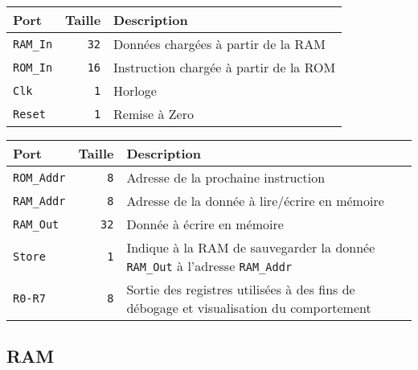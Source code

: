 \documentclass{article}
\begin{document}
    \begin{tabular}{|l|r|l|}
        \hline
        \textbf{Port}   & \textbf{Taille} & \textbf{Description}                   \\
        \hline

        \texttt{RAM\_In} & \texttt{32}     & Données chargées à partir de la RAM    \\
        \hline
        \texttt{ROM\_In} & \texttt{16}     & Instruction chargée à partir de la ROM \\
        \hline
        \texttt{Clk}    & \texttt{1}      & Horloge                                \\
        \hline
        \texttt{Reset}  & \texttt{1}      & Remise à Zero                          \\


        \hline
    \end{tabular}


    \begin{tabular}{|l|r|l|}
        \hline
        \textbf{Port}        & \textbf{Taille}     & \textbf{Description}                                                                       \\
        \hline

        \hline
        \texttt{ROM\_Addr} & \texttt{8}          & Adresse de la prochaine instruction                                                        \\
        \hline
        \texttt{RAM\_Addr} & \texttt{8}          & Adresse de la donnée à lire/écrire en mémoire                                              \\
        \hline
        \texttt{RAM\_Out}  & \texttt{32}         & Donnée à écrire en mémoire                                                                 \\
        \hline
        \texttt{Store}    & \texttt{1}          & Indique à la RAM de sauvegarder la donnée \texttt{RAM\_Out} à l'adresse \texttt{RAM\_Addr} \\
        \hline
        \texttt{R0-R7}    & \texttt{8\times 32} & Sortie des registres utilisées à des fins de débogage et visualisation du comportement     \\


        \hline
    \end{tabular}

    \subsection{RAM}
\end{document}
